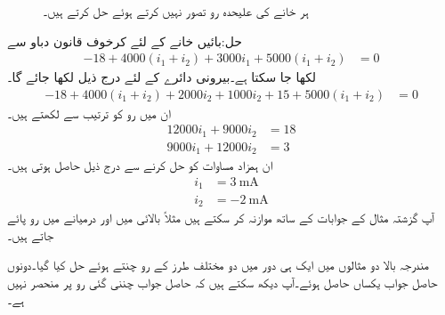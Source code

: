 \begin{figure}
\centering
{}%
\caption{ہر خانے کی علیحدہ رو تصور نہیں کرتے ہوئے حل کرتے ہیں۔}
\label{شکل_جوڑ_رو_دوسری_کو_لپیٹتی_ہے}
\end{figure}
حل:بائیں خانے کے لئے کرخوف قانون دباو سے
\begin{align*}
-18+4000(i_1+i_2)+3000 i_1+5000(i_1+i_2)&=0
\end{align*}
لکھا جا سکتا ہے۔بیرونی دائرے کے لئے درج ذیل لکھا جائے گا۔
\begin{align*}
-18+4000(i_1+i_2)+2000i_2 +1000i_2 +15+5000(i_1+i_2)&=0
\end{align*}
ان میں رو کو ترتیب سے لکھتے ہیں۔
\begin{align*}
12000 i_1+9000 i_2&=18\\
9000i_1+12000i_2&=3
\end{align*}
ان ہمزاد مساوات کو حل کرنے سے درج ذیل حاصل ہوتی ہیں۔
\begin{align*}
i_1&=\SI{3}{\milli\ampere}\\
i_2&=\SI{-2}{\milli\ampere}
\end{align*}
آپ گزشتہ مثال کے جوابات کے ساتھ موازنہ کر سکتے ہیں مثلاً بالائی  میں  اور درمیانے  میں  رو پائے جاتے ہیں۔

مندرجہ بالا دو مثالوں میں ایک ہی دور میں دو مختلف طرز کے رو چنتے ہوئے حل کیا گیا۔دونوں حاصل جواب یکساں حاصل ہوئے۔آپ دیکھ سکتے ہیں کہ حاصل جواب چننی گئی رو پر منحصر نہیں ہے۔

